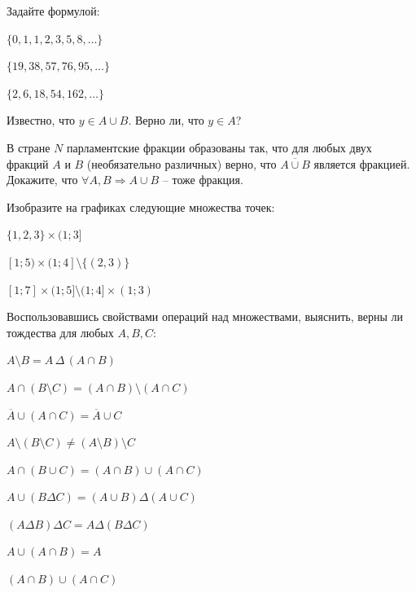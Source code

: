 \documentclass[a4paper,12pt,oneside]{article}
\begin{document}

Задайте формулой:
\begin{numlist}
    \item $\{0, 1, 1, 2, 3, 5, 8, \dots\}$
    \item $\{19, 38, 57, 76, 95, \dots\}$
    \item $\{2, 6, 18, 54, 162, \dots\}$
\end{numlist}

Известно, что $y \in A \cup B$. Верно ли, что $y \in A$?

В стране $N$ парламентские фракции образованы так, что для любых двух фракций $A$ и $B$ (необязательно различных) верно, что $\overline{A \cup B}$ является фракцией. Докажите, что $\forall A,B \Rightarrow A \cup B$ – тоже фракция.

Изобразите на графиках следующие множества точек:
\begin{numlist}
    \item $\{1,2,3\} \times (1; 3]$
    \item $[1; 5) \times (1; 4] \setminus \{(2, 3)\}$
    \item $[1; 7] \times (1;5] \setminus (1;4] \times (1;3)$
\end{numlist}

Воспользовавшись свойствами операций над множествами, выяснить, верны ли тождества для любых $A, B, C$:
\begin{numlist}
    \item $A \setminus B = A \,\Delta\, (A \cap B)$
    \item $A \cap (B \setminus C) = (A \cap B)\setminus (A \cap C)$
    \item $\overline{A} \cup (A \cap C) = \overline{A} \cup C$
    \item $A \setminus (B \setminus C) \neq (A \setminus B) \setminus C$
    \item $A \cap (B \cup C) = (A \cap B) \cup (A \cap C)$
    \item $A \cup (B \Delta C) = (A \cup B) \Delta (A \cup C)$
    \item $(A \Delta B) \Delta C = A \Delta (B \Delta C)$
    \item $A \cup (A \cap B) = A$
    \item $(A \cap B) \cup (A \cap C)$
\end{numlist}

\clearpage
\end{document}
